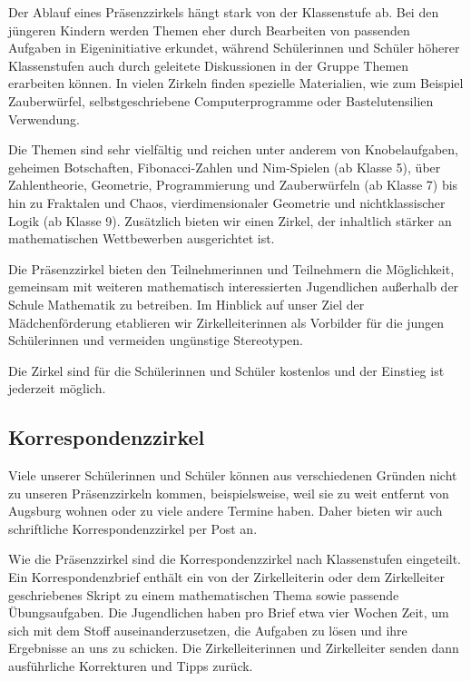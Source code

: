 \documentclass[12pt]{zettel}
\begin{document}
Der Ablauf eines Präsenzzirkels hängt stark von der Klassenstufe ab. Bei den
jüngeren Kindern werden Themen eher durch Bearbeiten von passenden
Aufgaben in Eigeninitiative erkundet, während Schülerinnen und Schüler höherer
Klassenstufen auch durch geleitete Diskussionen in der Gruppe
Themen erarbeiten können. In vielen Zirkeln finden spezielle Materialien,
wie zum Beispiel Zauberwürfel, selbstgeschriebene Computerprogramme oder
Bastelutensilien Verwendung.

Die Themen sind sehr vielfältig und reichen unter anderem von
Knobelaufgaben, geheimen Botschaften, Fibonacci-Zahlen und Nim-Spielen (ab Klasse 5),
über Zahlentheorie, Geometrie, Programmierung und Zauberwürfeln (ab Klasse 7) bis hin zu
Fraktalen und Chaos, vierdimensionaler Geometrie und nichtklassischer Logik
(ab Klasse 9). Zusätzlich bieten wir einen Zirkel, der inhaltlich stärker an
mathematischen Wettbewerben ausgerichtet ist.

Die Präsenzzirkel bieten den Teilnehmerinnen und Teilnehmern die Möglichkeit,
gemeinsam mit weiteren mathematisch interessierten Jugendlichen außerhalb der
Schule Mathematik zu betreiben. Im Hinblick auf unser Ziel der Mädchenförderung etablieren wir Zirkelleiterinnen als Vorbilder für die jungen Schülerinnen und vermeiden ungünstige Stereotypen.

Die Zirkel sind für die Schülerinnen und Schüler kostenlos und der Einstieg ist jederzeit möglich.

\subsection{Korrespondenzzirkel}

Viele unserer Schülerinnen und Schüler können aus verschiedenen Gründen
nicht zu unseren Präsenzzirkeln kommen, beispielsweise, weil sie zu weit
entfernt von Augsburg wohnen oder zu viele andere Termine haben.
Daher bieten wir auch schriftliche Korrespondenzzirkel per Post
an.

Wie die Präsenzzirkel sind die Korrespondenzzirkel nach Klassenstufen eingeteilt. Ein
Korrespondenzbrief enthält ein von der Zirkelleiterin oder dem
Zirkelleiter geschriebenes Skript zu einem mathematischen Thema sowie passende
Übungsaufgaben. Die Jugendlichen haben pro Brief etwa vier Wochen Zeit, um sich
mit dem Stoff auseinanderzusetzen, die Aufgaben zu lösen und ihre Ergebnisse
an uns zu schicken. Die Zirkelleiterinnen und Zirkelleiter senden dann
ausführliche Korrekturen und Tipps zurück.
\end{document}
